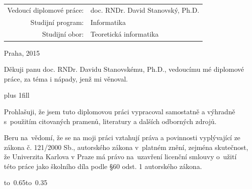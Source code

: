 \documentclass{cs-dipl}
\begin{document}
\begin{center}
\vspace{15mm}

\begin{tabular}{rl}
Vedoucí diplomové práce: & doc. RNDr. David Stanovský, Ph.D.\\
\noalign{\vspace{8mm}}
Studijní program:        & Informatika \\
\noalign{\vspace{3mm}}
Studijní obor:           & Teoretická informatika\\
\end{tabular}

\vspace{26mm}

Praha, 2015
\end{center}

\normalsize

\newpage

\renewcommand\thepage{Podekovani}

\vspace*{10mm}

\noindent
Děkuji panu doc. RNDr. Davidu Stanovskému, Ph.D., vedoucímu mé diplomové
práce, za téma i nápady, jenž mi věnoval.

\vfill

\newpage

\renewcommand\thepage{Cestne prohlaseni}


\vglue 0pt plus 1fill

\noindent
Prohlašuji, že jsem tuto diplomovou práci vypracoval samostatně a výhradně
s~použitím citovaných pramenů, literatury a dalších odborných zdrojů.

\medskip\noindent
Beru na~vědomí, že se na moji práci vztahují práva a povinnosti vyplývající
ze zákona č. 121/2000 Sb., autorského zákona v~platném znění, zejména
skutečnost, že Univerzita Karlova v Praze má právo na~uzavření licenční
smlouvy o~užití této práce jako školního díla podle §60 odst. 1 autorského
zákona.

\vspace{10mm}

\hbox{\hbox to 0.65\hbox to 0.35}

\vspace{20mm}
\end{document}
